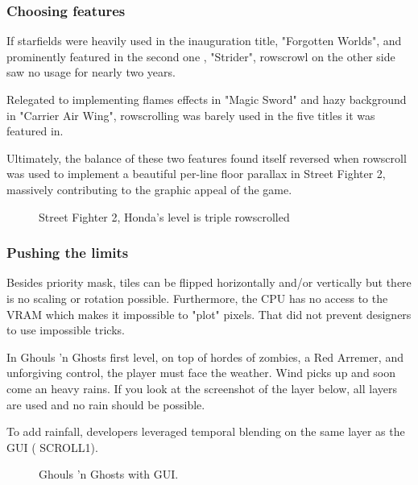 \subsubsection{Choosing features}


If starfields were heavily used in the inauguration title, "Forgotten Worlds", and prominently featured in the second one , "Strider", rowscrowl on the other side saw no usage for nearly two years. 

Relegated to implementing flames effects in "Magic Sword" and hazy background in "Carrier Air Wing", rowscrolling was barely used in the five titles\cite{mame_cps1_video} it was featured in.

Ultimately, the balance of these two features found itself reversed when rowscroll was used to implement a beautiful per-line floor parallax in Street Fighter 2, massively contributing to the graphic appeal of the game.


\vfill
\begin{figure}[!b]
 \caption*{Street Fighter 2, Honda's level is triple rowscrolled}%
 \end{figure}%
\pagebreak







\subsubsection{Pushing the limits}

Besides priority mask, tiles can be flipped horizontally and/or vertically but there is no scaling or rotation possible. Furthermore, the CPU has no access to the VRAM which makes it impossible to "plot" pixels. That did not prevent designers to use impossible tricks.



In Ghouls 'n Ghosts first level, on top of hordes of zombies, a Red Arremer, and unforgiving control, the player must face the weather. Wind picks up and soon come an heavy rains. If you look at the screenshot of the layer below, all layers are used and no rain should be possible.

To add rainfall, developers leveraged temporal blending on the same layer as the GUI ( SCROLL1). 

\vfill
\begin{figure}[!b]
 \caption*{Ghouls 'n Ghosts with GUI.}%
 \end{figure}%
\pagebreak


